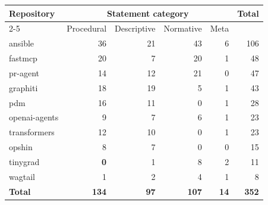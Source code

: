 \begin{tabular}{@{}lrrrrr@{}}
  \toprule
  Repository & \multicolumn{4}{c}{Statement category} & Total \\
  \cmidrule(lr){2-5}
   & Procedural & Descriptive & Normative & Meta & \\
  \midrule
  ansible & 36 & 21 & 43 & 6 & 106 \\
  \rowcolor{black!6} fastmcp & 20 & 7 & 20 & 1 & 48 \\
  pr-agent & 14 & 12 & 21 & 0 & 47 \\
  \rowcolor{black!6} graphiti & 18 & 19 & 5 & 1 & 43 \\
  pdm & 16 & 11 & 0 & 1 & 28 \\
  \rowcolor{black!6} openai-agents & 9 & 7 & 6 & 1 & 23 \\
  transformers & 12 & 10 & 0 & 1 & 23 \\
  \rowcolor{black!6} opshin & 8 & 7 & 0 & 0 & 15 \\
  tinygrad & \textbf{0} & 1 & 8 & 2 & 11 \\
  \rowcolor{black!6} wagtail & 1 & 2 & 4 & 1 & 8 \\
  \midrule
  \textbf{Total} & \textbf{134} & \textbf{97} & \textbf{107} & \textbf{14} & \textbf{352} \\
  \bottomrule
\end{tabular}
